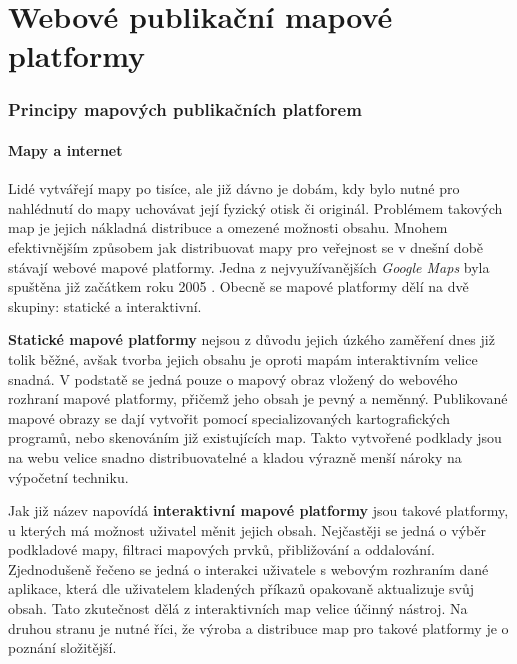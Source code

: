 \newpage

\part{Webové publikační mapové platformy}
\newpage
\section{Principy mapových publikačních platforem}

\subsection{Mapy a internet}

Lidé vytvářejí mapy po tisíce, ale již dávno je dobám, kdy bylo nutné
pro nahlédnutí do mapy uchovávat její fyzický otisk či originál. Problémem
takových map je jejich nákladná distribuce a omezené možnosti
obsahu. Mnohem efektivnějším způsobem jak distribuovat mapy pro
veřejnost se v dnešní době stávají webové mapové platformy. Jedna z
nejvyužívanějších \textit{Google Maps} byla spuštěna již začátkem
roku 2005 \cite{google_history}.  Obecně se mapové platformy dělí na
dvě skupiny: statické a interaktivní.

\textbf{Statické mapové platformy} nejsou z důvodu jejich úzkého
zaměření dnes již tolik běžné, avšak tvorba jejich obsahu je oproti
mapám interaktivním velice snadná. V podstatě se jedná pouze o mapový obraz vložený do webového rozhraní mapové platformy, přičemž jeho obsah je pevný a neměnný. Publikované mapové obrazy se dají vytvořit
pomocí specializovaných kartografických programů, nebo skenováním
již existujících map. Takto vytvořené podklady jsou na webu velice
snadno distribuovatelné a kladou výrazně menší nároky na výpočetní
techniku.

Jak již název napovídá \textbf{interaktivní mapové platformy} jsou
takové platformy, u kterých má možnost uživatel měnit jejich
obsah. Nejčastěji se jedná o výběr podkladové mapy, filtraci mapových
prvků, přibližování a oddalování. Zjednodušeně řečeno se jedná o
interakci uživatele s webovým rozhraním dané aplikace, která dle
uživatelem kladených příkazů opakovaně aktualizuje svůj
obsah\cite{web_mapping}. Tato zkutečnost dělá z interaktivních map
velice účinný nástroj. Na druhou stranu je nutné říci, že výroba a
distribuce map pro takové platformy je o poznání složitější.

